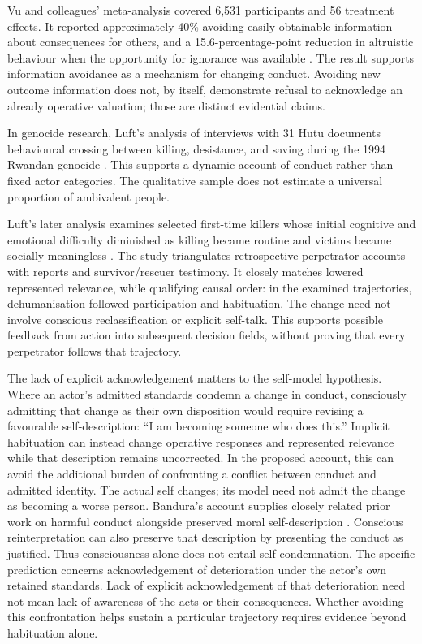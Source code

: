 \documentclass[11pt,a4paper]{article}
\theoremstyle{remark}
\begin{document}
Vu and colleagues' meta-analysis covered 6,531 participants and 56 treatment
effects. It reported approximately 40\% avoiding easily obtainable information
about consequences for others, and a 15.6-percentage-point reduction in altruistic
behaviour when the opportunity for ignorance was available
\citep{vu2023ignorance}. The result supports information avoidance as a mechanism
for changing conduct. Avoiding new outcome information does not, by itself,
demonstrate refusal to acknowledge an already operative valuation; those are
distinct evidential claims.

In genocide research, Luft's analysis of interviews with 31 Hutu documents
behavioural crossing between killing, desistance, and saving during the 1994
Rwandan genocide \citep{luft2015dynamic}. This supports a dynamic account of
conduct rather than fixed actor categories. The qualitative sample does not
estimate a universal proportion of ambivalent people.

Luft's later analysis examines selected first-time killers whose initial
cognitive and emotional difficulty diminished as killing became routine and
victims became socially meaningless \citep{luft2023career}. The study triangulates
retrospective perpetrator accounts with reports and survivor/rescuer testimony.
It closely matches lowered represented relevance, while qualifying causal order:
in the examined trajectories, dehumanisation followed participation and
habituation. The change need not involve conscious reclassification or explicit
self-talk. This supports possible feedback from action into subsequent decision
fields, without proving that every perpetrator follows that trajectory.

The lack of explicit acknowledgement matters to the self-model hypothesis.
Where an actor's admitted standards condemn a change in conduct, consciously
admitting that change as their own disposition would require revising a
favourable self-description: ``I am becoming someone who does this.'' Implicit
habituation can instead change operative responses and represented relevance
while that description remains uncorrected. In the proposed account, this can
avoid the additional burden of confronting a conflict between conduct and
admitted identity. The actual self changes; its model need not admit the change
as becoming a worse person. Bandura's account supplies closely related prior
work on harmful conduct alongside preserved moral self-description
\citep{bandura2002disengagement}. Conscious reinterpretation can also preserve
that description by presenting the conduct as justified. Thus consciousness
alone does not entail self-condemnation. The specific prediction concerns
acknowledgement of deterioration under the actor's own retained standards.
Lack of explicit acknowledgement of that deterioration need not mean lack of
awareness of the acts or their consequences. Whether avoiding this confrontation
helps sustain a particular trajectory requires evidence beyond habituation
alone.
\end{document}
